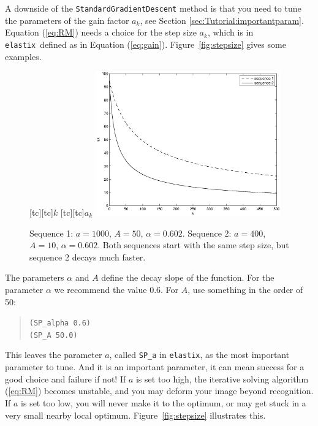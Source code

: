 \documentclass[]{report}
\newcommand{\elastix}{\texttt{elastix}}
\begin{document}
A downside of the \texttt{StandardGradientDescent} method is that
you need to tune the parameters of the gain factor $a_k$, see
Section \ref{sec:Tutorial:importantparam}. Equation (\ref{eq:RM})
needs a choice for the step size $a_k$, which is in \elastix\
defined as in Equation (\ref{eq:gain}). Figure~\ref{fig:stepsize}
gives some examples.

\begin{figure}
\centering {}[tc][tc]{$k$} [tc][tc]{$a_k$}
\includegraphics[width=8cm]{ak.eps}
\caption{Sequence 1: $a = 1000$, $A = 50$, $\alpha = 0.602$.
Sequence 2: $a = 400$, $A = 10$, $\alpha = 0.602$. Both sequences
start with the same step size, but sequence 2 decays much
faster.}\label{fig:ak}
\end{figure}
The parameters $\alpha$ and $A$ define the decay slope of the
function. For the parameter $\alpha$ we recommend the value 0.6.
For $A$, use something in the order of 50:
\begin{quote}
\texttt{(SP\_alpha 0.6)} \\
\texttt{(SP\_A 50.0)}
\end{quote}
This leaves the parameter $a$, called \texttt{SP\_a} in \elastix,
as the most important parameter to tune. And it is an important
parameter, it can mean success for a good choice and failure if
not! If $a$ is set too high, the iterative solving algorithm
(\ref{eq:RM}) becomes unstable, and you may deform your image
beyond recognition. If $a$ is set too low, you will never make it
to the optimum, or may get stuck in a very small nearby local
optimum. Figure~\ref{fig:stepsize} illustrates this.
\end{document}
